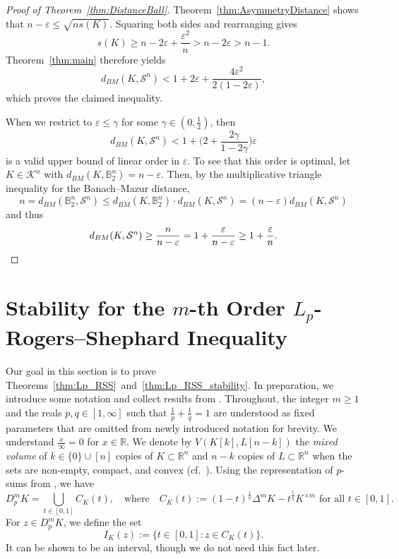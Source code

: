 \documentclass{amsart}
\newcommand{\cemph}[1]{\emph{\color{red}#1}}
\newcommand\R{\mathbb{R}}
\newcommand\B{\mathbb{B}}
\newcommand\CK{\mathcal{K}}
\newcommand{\diff}[3]{D_{#1}^{#2} #3}
\newcommand{\diag}[2]{\Delta^{#1} #2}
\newcommand{\lyz}[4]{C_{#3} (#4)}
\newcommand{\interval}[4]{I_{#3} (#4)}
\newcommand{\simplex}[1]{\mathcal{S}^{#1}}
\newcommand{\cartesian}[2]{#1^{\times #2}}
\begin{document}
\begin{proof}[Proof of Theorem~\ref{thm:DistanceBall}]
Theorem~\ref{thm:AsymmetryDistance} shows that $n - \varepsilon \leq \sqrt{n s(K)}$.
Squaring both sides and rearranging gives
\[
	s(K)
	\geq n - 2 \varepsilon + \frac{\varepsilon^2}{n}
	> n - 2 \varepsilon
	> n - 1.
\]
Theorem~\ref{thm:main} therefore yields
\[
	d_{BM}(K,\simplex{n})
	< 1 + 2 \varepsilon + \frac{4 \varepsilon^2}{2 (1 - 2 \varepsilon)},
\]
which proves the claimed inequality.

When we restrict to $\varepsilon \leq \gamma$ for some $\gamma \in (0,\frac{1}{2})$,
then
\[
    d_{BM}(K,\simplex{n})
    < 1 + \bigg(2 + \frac{2 \gamma}{1 - 2 \gamma} \bigg) \varepsilon
\]
is a valid upper bound of linear order in $\varepsilon$.
To see that this order is optimal,
let $K \in \CK^n$ with $d_{BM}(K,\B_2^n) = n - \varepsilon$.
Then, by the multiplicative triangle inequality for the Banach--Mazur distance,
\[
	n
	= d_{BM}(\B_2^n,\simplex{n})
	\leq d_{BM}(K,\B_2^n) \cdot d_{BM}(K,\simplex{n})
	= (n - \varepsilon) d_{BM}(K,\simplex{n})
\]
and thus
\[
	d_{BM}(K,\simplex{n})
	\geq \frac{n}{n-\varepsilon}
	= 1 + \frac{\varepsilon}{n - \varepsilon}
	\geq 1 + \frac{\varepsilon}{n}. \qedhere
\]
\end{proof}




\section{Stability for the \texorpdfstring{$m$}{m}-th Order \texorpdfstring{$L_p$}{Lp}-Rogers--Shephard Inequality}\label{sec:RS}



Our goal in this section is to prove Theorems~\ref{thm:Lp_RSS}~and~\ref{thm:Lp_RSS_stability}.
In preparation, we introduce some notation and collect results from \cite{2025:Kotrbaty,2026:KotrbatyMouamine}.
Throughout, the integer $m \geq 1$ and the reals $p,q \in [1,\infty]$ such that $\frac{1}{p} + \frac{1}{q} = 1$ are understood as fixed parameters that are omitted from newly introduced notation for brevity.
We understand $\frac{x}{\infty} = 0$ for $x \in \R$.
We denote by $V(K[k],L[n-k])$ the \cemph{mixed volume} of $k \in \{0\} \cup [n]$ copies of $K \subset \R^n$ and $n-k$ copies of $L \subset \R^n$ when the sets are non-empty, compact, and convex (cf.~\cite[Chapter~$5$]{2014:Schneider}).
Using the representation of $p$-sums from \cite{2012:LutwakYangZhang}, we have
\[
    \diff{p}{m}{K}
    = \bigcup_{t \in [0,1]} \lyz{p}{m}{K}{t},
        \quad \text{where} \quad
    \lyz{p}{m}{K}{t}
    := (1-t)^{\frac{1}{q}} \diag{m}{K} - t^{\frac{1}{q}} \cartesian{K}{m}
    \text{ for all } t \in [0,1].
\]
For $z \in \diff{p}{m}{K}$, we define the set
\[
    \interval{p}{m}{K}{z}
    := \{ t \in [0,1] : z \in \lyz{p}{m}{K}{t} \}.
\]
It can be shown to be an interval, though we do not need this fact later.
\end{document}
